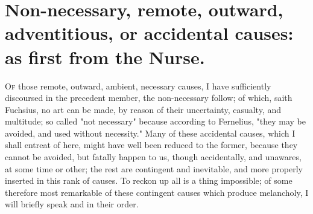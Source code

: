 \section[Remote or accidental causes]{Non-necessary, remote, outward,
adventitious, or accidental causes: as first from the Nurse.}

\lettrine{O}{f} those remote, outward, ambient, necessary causes, I have
sufficiently discoursed in the precedent member, the non-necessary follow; of
which, saith Fuchsius, no art can be made, by reason of
their uncertainty, casualty, and multitude; so called "not necessary" because
according to Fernelius, "they may be avoided, and used
without necessity." Many of these accidental causes, which I shall entreat of
here, might have well been reduced to the former, because they cannot be
avoided, but fatally happen to us, though accidentally, and unawares, at some
time or other; the rest are contingent and inevitable, and more properly
inserted in this rank of causes. To reckon up all is a thing impossible; of
some therefore most remarkable of these contingent causes which produce
melancholy, I will briefly speak and in their order.

